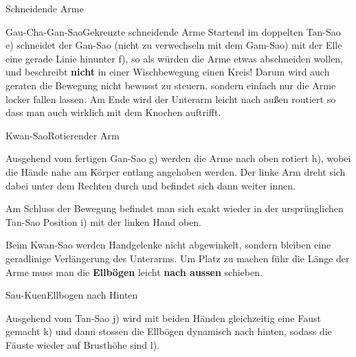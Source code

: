 \begin{WTSatz}{Schneidende Arme}
\begin{WTSatzTeil}{Gau-Cha-Gan-Sao}{Gekreuzte schneidende Arme}
		Startend im doppelten Tan-Sao e) schneidet der Gan-Sao (nicht zu verwechseln mit dem Gam-Sao) mit der Elle eine gerade Linie hinunter f), so als w\"urden die Arme etwas abschneiden wollen, und beschreibt \textbf{nicht} in einer Wischbewegung einen Kreis! Darum wird auch geraten die Bewegung nicht bewusst zu steuern, sondern einfach nur die Arme locker fallen lassen. Am Ende wird der Unterarm leicht nach au{\ss}en routiert so dass man auch wirklich mit dem Knochen auftrifft.
	\end{WTSatzTeil}
	
	\begin{WTSatzTeil}{Kwan-Sao}{Rotierender Arm}
		
		Ausgehend vom fertigen Gan-Sao g) werden die Arme nach oben rotiert h), wobei die H\"ande nahe am K\"orper entlang angehoben werden. Der linke Arm dreht sich dabei unter dem Rechten durch und befindet sich dann weiter innen.
		
		Am Schluss der Bewegung befindet man sich exakt wieder in der urspr\"unglichen Tan-Sao Position i) mit der linken Hand oben.
		
		\begin{WTCommonNoob}
			Beim Kwan-Sao werden Handgelenke nicht abgewinkelt, sondern bleiben eine geradlinige Verl\"angerung des Unterarms. Um Platz zu machen f\"uhr die L\"ange der Arme muss man die \textbf{Ellb\"ogen} leicht \textbf{nach aussen} schieben.
		\end{WTCommonNoob}
	\end{WTSatzTeil}
	
	\begin{WTSatzTeil}{Sau-Kuen}{Ellbogen nach Hinten}
		
		Ausgehend vom Tan-Sao j) wird mit beiden H\"anden gleichzeitig eine Faust gemacht k) und dann stossen die Ellb\"ogen dynamisch nach hinten, sodass die F\"auste wieder auf Brusth\"ohe sind l).
	\end{WTSatzTeil}
	
\end{WTSatz}


